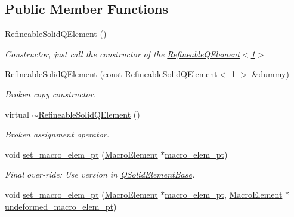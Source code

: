 \subsection*{Public Member Functions}
\begin{DoxyCompactItemize}
\item 
\hyperlink{classoomph_1_1RefineableSolidQElement_3_011_01_4_a018251a542881b575e5994c4bf42fcf8}{Refineable\+Solid\+Q\+Element} ()
\begin{DoxyCompactList}\small\item\em Constructor, just call the constructor of the \hyperlink{classoomph_1_1RefineableQElement_3_011_01_4}{Refineable\+Q\+Element$<$1$>$} \end{DoxyCompactList}\item 
\hyperlink{classoomph_1_1RefineableSolidQElement_3_011_01_4_ac620433422ba424bd43c8d91302a645a}{Refineable\+Solid\+Q\+Element} (const \hyperlink{classoomph_1_1RefineableSolidQElement}{Refineable\+Solid\+Q\+Element}$<$ 1 $>$ \&dummy)
\begin{DoxyCompactList}\small\item\em Broken copy constructor. \end{DoxyCompactList}\item 
virtual \hyperlink{classoomph_1_1RefineableSolidQElement_3_011_01_4_ab930f7bef6bac1e6d6ac4a0e93bb8149}{$\sim$\+Refineable\+Solid\+Q\+Element} ()
\begin{DoxyCompactList}\small\item\em Broken assignment operator. \end{DoxyCompactList}\item 
void \hyperlink{classoomph_1_1RefineableSolidQElement_3_011_01_4_ae0cd264bee16dd1d05d35f79e33dd408}{set\+\_\+macro\+\_\+elem\+\_\+pt} (\hyperlink{classoomph_1_1MacroElement}{Macro\+Element} $\ast$\hyperlink{classoomph_1_1FiniteElement_aa8bce95f69e3199a508672eea7ecc226}{macro\+\_\+elem\+\_\+pt})
\begin{DoxyCompactList}\small\item\em Final over-\/ride\+: Use version in \hyperlink{classoomph_1_1QSolidElementBase}{Q\+Solid\+Element\+Base}. \end{DoxyCompactList}\item 
void \hyperlink{classoomph_1_1RefineableSolidQElement_3_011_01_4_a9dd7e2622260d14c2bf92125707a3401}{set\+\_\+macro\+\_\+elem\+\_\+pt} (\hyperlink{classoomph_1_1MacroElement}{Macro\+Element} $\ast$\hyperlink{classoomph_1_1FiniteElement_aa8bce95f69e3199a508672eea7ecc226}{macro\+\_\+elem\+\_\+pt}, \hyperlink{classoomph_1_1MacroElement}{Macro\+Element} $\ast$\hyperlink{classoomph_1_1SolidFiniteElement_a20517d8d6ba84c8e90d880f38310915f}{undeformed\+\_\+macro\+\_\+elem\+\_\+pt})

\end{DoxyCompactItemize}
